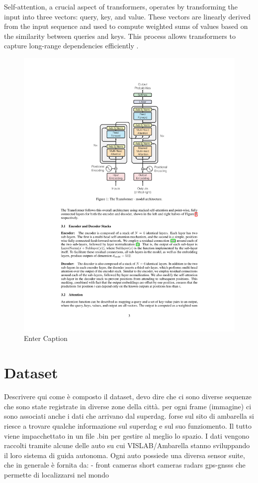 Self-attention, a crucial aspect of transformers, operates by transforming the input into three vectors: query, key, and value. These vectors are linearly derived from the input sequence and used to compute weighted sums of values based on the similarity between queries and keys. This process allows transformers to capture long-range dependencies efficiently \cite{DBLP:journals/corr/abs-1906-05909}.
\begin{figure}[H]
    \centering
    \includegraphics[width=0.65\linewidth]{LateX//figs/attention_transformer_architecture.pdf}
    \caption{Enter Caption}
    \label{fig:enter-label}
\end{figure}



\section{Dataset}
Descrivere qui come è composto il dataset, devo dire che ci sono diverse sequenze che sono state registrate in diverse zone della città. per ogni frame (immagine) ci sono associati anche i dati che arrivano dal superdag. forse sul sito di ambarella si riesce a trovare qualche informazione sul superdag e sul suo funziomento. 
Il tutto viene impacchettato in un file .bin per gestire al meglio lo spazio. 
I dati vengono raccolti tramite alcune delle auto su cui VISLAB/Ambarella stanno sviluppando il loro sistema di guida autonoma. 
Ogni auto possiede una diversa sensor suite, che in generale è fornita da:
- front cameras
short cameras 
radars 
gps-gnsss che permette di localizzarsi nel mondo

